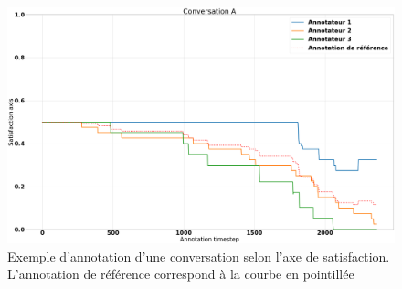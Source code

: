 \begin{figure}
  \centering
  \includegraphics[width=15cm]{./Chapitre4/figures/annotTroisGold.png}
  \caption{Exemple d'annotation d'une conversation selon l'axe de satisfaction. L'annotation de référence correspond à la courbe en pointillée}
  \label{fig:annotTroisGold}
\end{figure}
